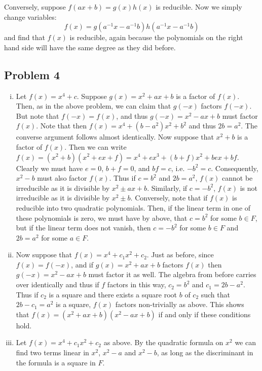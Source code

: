 \documentclass{../../mathnotes}
\begin{document}
Conversely, suppose $f(ax+b)=g(x)h(x)$ is reducible. Now we simply change variables:
\[f(x)=g(a^{-1}x-a^{-1}b)h(a^{-1}x-a^{-1}b)\]
and find that $f(x)$ is reducible, again because the polynomials on the right hand side will have the same degree
as they did before.

\subsection*{Problem 4}

\begin{enumerate}[(i)]
    \item Let $f(x)=x^4+c$. Suppose $g(x)=x^2+ax+b$ is a factor of $f(x)$. Then, as in the above problem,
        we can claim that $g(-x)$ factors $f(-x)$. But note that $f(-x)=f(x)$, and thus $g(-x)=x^2-ax+b$
        must factor $f(x)$. Note that then $f(x)=x^4+(b-a^2)x^2+b^2$ and thus $2b=a^2$.
        The converse argument follows almost identically. Now suppose that $x^2+b$ is a factor
        of $f(x)$. Then we can write $f(x)=(x^2+b)(x^2+ex+f)=x^4+ex^3+(b+f)x^2+bex+bf$. Clearly we must have $e=0$,
        $b+f=0$, and $bf=c$, i.e. $-b^2=c$. Consequently, $x^2-b$ must also factor $f(x)$. 
        Thus if $c=b^2$ and $2b=a^2$, $f(x)$ cannot be irreducible as it is divisible by $x^2\pm ax+b$. Similarly,
        if $c=-b^2$, $f(x)$ is not irreducible as it is divisible by $x^2\pm b$. Conversely, note that
        if $f(x)$ is reducible into two quadratic polynomials. Then, if the linear term in one of these
        polynomials is zero, we must have by above, that $c=b^2$ for some $b\in F$, but if the linear term
        does not vanish, then $c=-b^2$ for some $b\in F$ and $2b=a^2$ for some $a\in F$.
    \item Now suppose that $f(x)=x^4+c_1x^2+c_2$. Just as before, since $f(x)=f(-x)$, and if $g(x)=x^2+ax+b$
        factors $f(x)$ then $g(-x)=x^2-ax+b$ must factor it as well. The algebra from before carries over identically
        and thus if $f$ factors in this way, $c_2=b^2$ and $c_1=2b-a^2$. Thus if $c_2$ is a square and there exists
        a square root $b$ of $c_2$ such that $2b-c_1=a^2$ is a square, $f(x)$ factors non-trivially as above. This shows
        that $f(x)=(x^2+ax+b)(x^2-ax+b)$ if and only if these conditions hold.
    \item Let $f(x)=x^4+c_1x^2+c_2$ as above. By the quadratic formula on $x^2$ we can find two terms linear in $x^2$,
        $x^2-a$ and $x^2-b$, as long as the discriminant in the formula is a square in $F$.
\end{enumerate}
\end{document}

